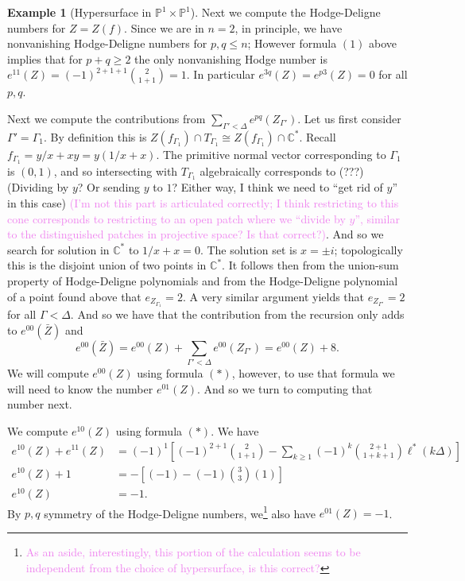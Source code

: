 \documentclass{article}
\theoremstyle{definition}
\newtheorem{example}[theorem]{Example}
\theoremstyle{remark}
\newcommand{\wg}[1]{\textcolor{violet}{#1}}
\newcommand{\C}{\mathbb C}
\renewcommand{\P}{\mathbb P}
\begin{document}
\begin{example}[Hypersurface in $\P^1 \times \P^1$]
    Next we compute the Hodge-Deligne numbers for $Z = Z(f)$. 
    Since we are in $n = 2$, in principle, we have nonvanishing
    Hodge-Deligne numbers for $p,q \leq n$; However 
    formula $(1)$     
    above implies that for $p + q \geq 2$ the only
    nonvanishing Hodge number is $e^{11}(Z) = (-1)^{2 + 1
    +1}\binom{2}{1 + 1} = 1$. 
    In particular $e^{3q}(Z) = e^{p3}(Z) = 0$ for all $p,q$. 

    Next we compute the contributions from $\sum_{\Gamma' < \Delta}
    e^{pq}(Z_{\Gamma'})$. 
    Let us first consider $\Gamma'= \Gamma_1$.
    By definition this is $Z(f_{\Gamma_1}) \cap T_{\Gamma_1} \cong
    Z(f_{\Gamma_1}) \cap \C^*$. 
    Recall $f_{\Gamma_1} = y/x + xy = y(1/x + x)$. The primitive
    normal vector
    corresponding to $\Gamma_1$ is $(0,1)$, 
    and so intersecting with $T_{\Gamma_1}$ algebraically
    corresponds to (???) (Dividing by $y$? Or sending $y$ to $1$?
    Either way, I think we need to ``get rid of $y$'' in this case) \wg{(I'm not this part is
    articulated correctly; I think restricting to this cone
    corresponds to restricting to an open patch where we ``divide by
    $y$'', similar to the distinguished patches in projective space?
    Is that correct?)}. 
    And so we search for solution in $\C^*$ to $1/x + x = 0$. 
    The solution set is $x = \pm i$; topologically this is the
    disjoint union of two points in $\C^*$. It follows then from the
    union-sum property of Hodge-Deligne polynomials and from the
    Hodge-Deligne polynomial of a point found above that 
    $e_{Z_{\Gamma_1}} = 2$.
    A very similar argument yields that $e_{Z_{\Gamma'}} = 2$ for all
    $\Gamma < \Delta$. And so we have that the contribution from the
    recursion only adds to $e^{00}(\bar Z)$ and
    \[
        e^{00}(\bar Z) = e^{00}(Z) + \sum_{\Gamma' < \Delta} e^{00}(Z_{\Gamma'}) 
        = e^{00}(Z) + 8.
    \]
    We will compute $e^{00}(Z)$ using formula $(*)$, however, to use
    that formula we will need to know the number $e^{01}(Z)$. And so
    we turn to computing that number next.
    
    We compute $e^{10}(Z)$ using formula $(*)$. We have
    \begin{align*}
        e^{10}(Z) + e^{11}(Z) 
        &= (-1)^{1}\left[
            (-1)^{2 + 1}\binom{2}{1 + 1} - \sum_{k \geq 1} (-1)^{k} \binom{2+1}{1 + k + 1} \ell^*(k\Delta)
        \right] \\
        e^{10}(Z) + 1 &= -\left[
            (-1) - (-1) \binom{3}{3}(1)
        \right] \\
        e^{10}(Z) &= -1.
    \end{align*}
    By $p,q$ symmetry of the Hodge-Deligne numbers, we\footnote{
        \wg{As an aside, interestingly, this portion of the calculation
        seems to be independent from the choice of hypersurface, is this correct?}
    }
    also have $e^{01}(Z) = -1$.


\end{example}
\end{document}
